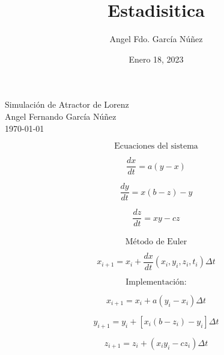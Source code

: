 \documentclass[10pt,a4papper]{article}
\author{Angel Fdo. García Núñez}
\date{Enero 18, 2023}
\title{Estadisitica}
\begin{document}
\Huge
Simulación de Atractor de Lorenz\\

Angel Fernando García Núñez\\
\today


\Large
\newpage
\[\text{Ecuaciones del sistema}\]

\[\frac{dx}{dt}=a(y-x)\]

\[\frac{dy}{dt}=x(b-z)-y\]

\[\frac{dz}{dt}=xy-cz\]\\

\[\text{Método de Euler}\]

\[x_{i+1}=x_i+\frac{dx}{dt}(x_i,y_i,z_i,t_i)\Delta t\]

\[\text{Implementación:}\]

\[x_{i+1}=x_i+a(y_i-x_i)\Delta t\]

\[y_{i+1}=y_i+[x_i(b-z_i)-y_i]\Delta t\]

\[z_{i+1}=z_i+(x_iy_i-cz_i)\Delta t\]

\newpage

\newpage

\newpage

\newpage

\newpage

\newpage

\newpage

\newpage

\newpage

\newpage

\newpage

\newpage

\newpage

\newpage

\newpage

\newpage

\newpage

\newpage

\newpage

\newpage

\newpage

\newpage

\newpage

\newpage

\newpage

\newpage

\newpage

\newpage

\newpage

\newpage

\newpage

\newpage
\end{document}
